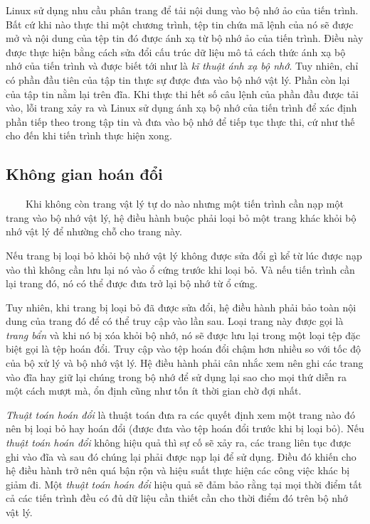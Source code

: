 \documentclass{article}
\begin{document}
Linux sử dụng nhu cầu phân trang để tải nội dung vào bộ nhớ ảo của tiến trình. Bất cứ khi nào thực thi một chương trình, tệp tin chứa mã lệnh của nó sẽ được mở và nội dung của tệp tin đó được ánh xạ từ bộ nhớ ảo của tiến trình. Điều này được thực hiện bằng cách sửa đổi cấu trúc dữ liệu mô tả cách thức ánh xạ bộ nhớ của tiến trình và được biết tới như là \textit{kĩ thuật ánh xạ bộ nhớ}. Tuy nhiên, chỉ có phần đầu tiên của tập tin thực sự được đưa vào bộ nhớ vật lý. Phần còn lại của tập tin nằm lại trên đĩa. Khi thực thi hết số câu lệnh của phần đầu được tải vào, lỗi trang xảy ra và Linux sử dụng ánh xạ bộ nhớ của tiến trình để xác định phần tiếp theo trong tập tin và đưa vào bộ nhớ để tiếp tục thực thi, cứ như thế cho đến khi tiến trình thực hiện xong.

\subsection{Không gian hoán đổi}
~~~~Khi không còn trang vật lý tự do nào nhưng một tiến trình cần nạp một trang vào bộ nhớ vật lý, hệ điều hành buộc phải loại bỏ một trang khác khỏi bộ nhớ vật lý để nhường chỗ cho trang này.\vspace{1em}

Nếu trang bị loại bỏ khỏi bộ nhớ vật lý không được sửa đổi gì kể từ lúc được nạp vào thì không cần lưu lại nó vào ổ cứng trước khi loại bỏ. Và nếu tiến trình cần lại trang đó, nó có thể được đưa trở lại bộ nhớ từ ổ cứng.\vspace{1em}

Tuy nhiên, khi trang bị loại bỏ đã được sửa đổi, hệ điều hành phải bảo toàn nội dung của trang đó để có thể truy cập vào lần sau. Loại trang này được gọi là \textit{trang bẩn} và khi nó bị xóa khỏi bộ nhớ, nó sẽ được lưu lại trong một loại tệp đặc biệt gọi là tệp hoán đổi. Truy cập vào tệp hoán đổi chậm hơn nhiều so với tốc độ của bộ xử lý và bộ nhớ vật lý. Hệ điều hành phải cân nhắc xem nên ghi các trang vào đĩa hay giữ lại chúng trong bộ nhớ để sử dụng lại sao cho mọi thứ diễn ra một cách mượt mà, ổn định cũng như tốn ít thời gian chờ đợi nhất.\vspace{1em}

\textit{Thuật toán hoán đổi} là thuật toán đưa ra các quyết định xem một trang nào đó nên bị loại bỏ hay hoán đổi (được đưa vào tệp hoán đổi trước khi bị loại bỏ). Nếu \textit{thuật toán hoán đổi} không hiệu quả thì sự cố sẽ xảy ra, các trang liên tục được ghi vào đĩa và sau đó chúng lại phải được nạp lại để sử dụng. Điều đó khiến cho hệ điều hành trở nên quá bận rộn và hiệu suất thực hiện các công việc khác bị giảm đi. Một \textit{thuật toán hoán đổi} hiệu quả sẽ đảm bảo rằng tại mọi thời điểm tất cả các tiến trình đều có đủ dữ liệu cần thiết cần cho thời điểm đó trên bộ nhớ vật lý.\vspace{1em}
\end{document}
